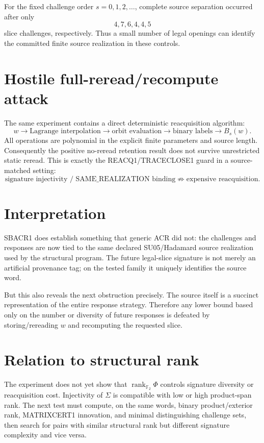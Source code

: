 \documentclass[11pt]{article}\usepackage[margin=.88in]{geometry}\usepackage{amsmath,amssymb,booktabs}
\begin{document}
For the fixed challenge order $s=0,1,2,\ldots$, complete source separation occurred after only
\[
4,7,6,4,4,5
\]
slice challenges, respectively. Thus a small number of legal openings can identify the committed finite source realization in these controls.

\section*{Hostile full-reread/recompute attack}
The same experiment contains a direct deterministic reacquisition algorithm:
\[
w\to\text{Lagrange interpolation}\to\text{orbit evaluation}\to
\text{binary labels}\to B_s(w).
\]
All operations are polynomial in the explicit finite parameters and source length. Consequently the positive no-reread retention result does not survive unrestricted static reread. This is exactly the REACQ1/TRACECLOSE1 guard in a source-matched setting:
\[
\boxed{\text{signature injectivity / SAME\_REALIZATION binding}\not\Rightarrow\text{expensive reacquisition}.}
\]

\section*{Interpretation}
SBACR1 does establish something that generic ACR did not: the challenges and responses are now tied to the same declared SU05/Hadamard source realization used by the structural program. The future legal-slice signature is not merely an artificial provenance tag; on the tested family it uniquely identifies the source word.

But this also reveals the next obstruction precisely. The source itself is a succinct representation of the entire response strategy. Therefore any lower bound based only on the number or diversity of future responses is defeated by storing/rereading $w$ and recomputing the requested slice.

\section*{Relation to structural rank}
The experiment does not yet show that $\operatorname{rank}_{\mathbb F_2}\Phi$ controls signature diversity or reacquisition cost. Injectivity of $\Sigma$ is compatible with low or high product-span rank. The next test must compute, on the same words, binary product/exterior rank, MATRIXCERT1 innovation, and minimal distinguishing challenge sets, then search for pairs with similar structural rank but different signature complexity and vice versa.
\end{document}
